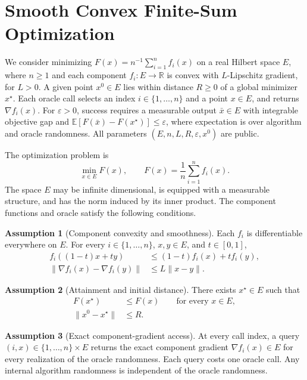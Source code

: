 \documentclass[10pt]{article}
\theoremstyle{definition}
\newtheorem{assumption}{Assumption}
\begin{document}
\section*{Smooth Convex Finite-Sum Optimization}
We consider minimizing $F(x)=n^{-1}\sum_{i=1}^n f_i(x)$ on a real Hilbert space $E$, where $n\geq 1$ and each component $f_i:E\to\mathbb{R}$ is convex with $L$-Lipschitz gradient, for $L>0$. A given point $x^0\in E$ lies within distance $R\geq 0$ of a global minimizer $x^\star$. Each oracle call selects an index $i\in\{1,\ldots,n\}$ and a point $x\in E$, and returns $\nabla f_i(x)$. For $\varepsilon>0$, success requires a measurable output $\bar{x}\in E$ with integrable objective gap and $\mathbb{E}[F(\bar{x})-F(x^\star)]\leq\varepsilon$, where expectation is over algorithm and oracle randomness. All parameters $(E,n,L,R,\varepsilon,x^0)$ are public.

The optimization problem is
\begin{equation}
\label{eq:problem}
\min_{x\in E} F(x),
\qquad F(x)=\frac{1}{n}\sum_{i=1}^n f_i(x).
\end{equation}
The space $E$ may be infinite dimensional, is equipped with a measurable structure, and has the norm induced by its inner product. The component functions and oracle satisfy the following conditions.

\begin{assumption}[Component convexity and smoothness]
Each $f_i$ is differentiable everywhere on $E$. For every $i\in\{1,\ldots,n\}$, $x,y\in E$, and $t\in[0,1]$,
\begin{align}
f_i((1-t)x+ty) &\leq (1-t)f_i(x)+tf_i(y),\\
\|\nabla f_i(x)-\nabla f_i(y)\| &\leq L\|x-y\|.
\end{align}
\end{assumption}

\begin{assumption}[Attainment and initial distance]
There exists $x^\star\in E$ such that
\begin{align}
F(x^\star) &\leq F(x) \qquad \text{for every }x\in E,\\
\|x^0-x^\star\| &\leq R.
\end{align}
\end{assumption}

\begin{assumption}[Exact component-gradient access]
At every call index, a query $(i,x)\in\{1,\ldots,n\}\times E$ returns the exact component gradient $\nabla f_i(x)\in E$ for every realization of the oracle randomness. Each query costs one oracle call. Any internal algorithm randomness is independent of the oracle randomness.
\end{assumption}
\end{document}
